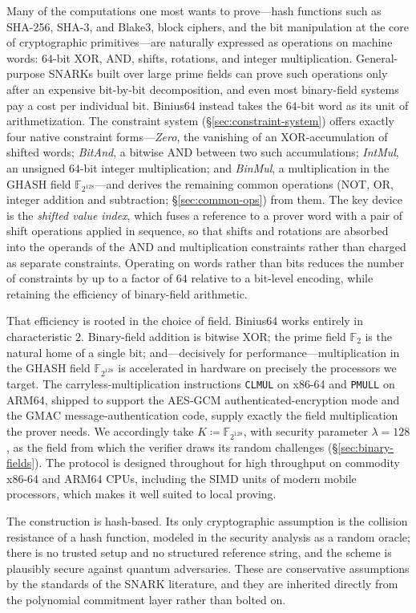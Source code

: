 \documentclass{article}
\theoremstyle{definition}
\newcommand{\FF}[1]{\mathbb{F}_{#1}}
\begin{document}
Many of the computations one most wants to prove---hash functions such as SHA-256, SHA-3, and Blake3, block ciphers, and the bit manipulation at the core of cryptographic primitives---are naturally expressed as operations on machine words: $64$-bit XOR, AND, shifts, rotations, and integer multiplication. General-purpose SNARKs built over large prime fields can prove such operations only after an expensive bit-by-bit decomposition, and even most binary-field systems pay a cost per individual bit. Binius64 instead takes the $64$-bit word as its unit of arithmetization. The constraint system (\S\ref{sec:constraint-system}) offers exactly four native constraint forms---\emph{Zero}, the vanishing of an XOR-accumulation of shifted words; \emph{BitAnd}, a bitwise AND between two such accumulations; \emph{IntMul}, an unsigned $64$-bit integer multiplication; and \emph{BinMul}, a multiplication in the GHASH field $\FF{2^{128}}$---and derives the remaining common operations (NOT, OR, integer addition and subtraction; \S\ref{sec:common-ops}) from them. The key device is the \emph{shifted value index}, which fuses a reference to a prover word with a pair of shift operations applied in sequence, so that shifts and rotations are absorbed into the operands of the AND and multiplication constraints rather than charged as separate constraints. Operating on words rather than bits reduces the number of constraints by up to a factor of $64$ relative to a bit-level encoding, while retaining the efficiency of binary-field arithmetic.

That efficiency is rooted in the choice of field. Binius64 works entirely in characteristic $2$. Binary-field addition is bitwise XOR; the prime field $\FF{2}$ is the natural home of a single bit; and---decisively for performance---multiplication in the GHASH field $\FF{2^{128}}$ is accelerated in hardware on precisely the processors we target. The carryless-multiplication instructions \texttt{CLMUL} on x86-64 and \texttt{PMULL} on ARM64, shipped to support the AES-GCM authenticated-encryption mode and the GMAC message-authentication code, supply exactly the field multiplication the prover needs. We accordingly take $K \coloneqq \FF{2^{128}}$, with security parameter $\lambda = 128$, as the field from which the verifier draws its random challenges (\S\ref{sec:binary-fields}). The protocol is designed throughout for high throughput on commodity x86-64 and ARM64 CPUs, including the SIMD units of modern mobile processors, which makes it well suited to local proving.

The construction is hash-based. Its only cryptographic assumption is the collision resistance of a hash function, modeled in the security analysis as a random oracle; there is no trusted setup and no structured reference string, and the scheme is plausibly secure against quantum adversaries. These are conservative assumptions by the standards of the SNARK literature, and they are inherited directly from the polynomial commitment layer rather than bolted on.
\end{document}
